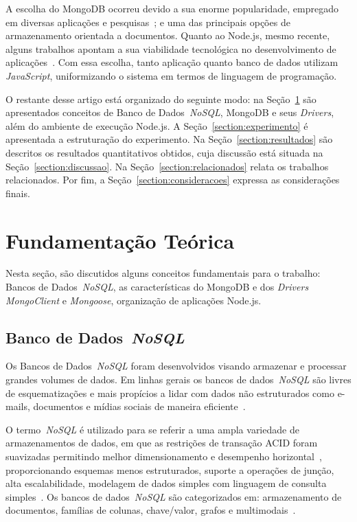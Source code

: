 \documentclass[12pt]{article}
\begin{document}
A escolha do MongoDB ocorreu devido a sua enorme popularidade, empregado em diversas aplicações e pesquisas~\cite{patil:2017,jung:2015,ongo:2018,kanade2014study}; e uma das principais opções de armazenamento orientada a documentos. 
Quanto ao Node.js, mesmo recente, alguns trabalhos apontam a sua viabilidade tecnológica no desenvolvimento de aplicações~\cite{chaniotis2015node}. Com essa escolha, tanto aplicação quanto banco de dados utilizam \textit{JavaScript}, uniformizando o sistema em termos de linguagem de programação.

O restante desse artigo está organizado do seguinte modo: na Seção~\ref{section:fundamentacao} são apresentados conceitos de Banco de Dados~\emph{NoSQL}, MongoDB e seus \emph{Drivers}, além do ambiente de execução Node.js. 
A Seção~\ref{section:experimento} é apresentada a estruturação do experimento. 
Na Seção~\ref{section:resultados} são descritos os resultados quantitativos obtidos, cuja discussão está situada na Seção~\ref{section:discussao}. Na Seção~\ref{section:relacionados} relata os trabalhos relacionados. Por fim, a Seção~\ref{section:consideracoes} expressa as considerações finais.

\section{Fundamentação Teórica}
\label{section:fundamentacao}

Nesta seção, são discutidos alguns conceitos fundamentais para o trabalho: Bancos de Dados~\emph{NoSQL}, as características do MongoDB e dos \emph{Drivers} \emph{MongoClient} e \emph{Mongoose}, organização de aplicações Node.js. 

\subsection{Banco de Dados~\emph{NoSQL}}
\label{subsection:nao-relacional}

Os Bancos de Dados~\emph{NoSQL} foram desenvolvidos visando armazenar e processar grandes volumes de dados. 
Em linhas gerais os bancos de dados~\emph{NoSQL} são livres de esquematizações e mais propícios a lidar com dados não estruturados como e-mails, documentos e mídias sociais de maneira eficiente~\cite{mohamed:2014,ramesh:2016}.

O termo~\emph{NoSQL} é utilizado para se referir a uma ampla variedade de armazenamentos de dados, em que as restrições de transação ACID foram suavizadas permitindo melhor dimensionamento e desempenho horizontal~\cite{rafique:2018}, proporcionando esquemas menos estruturados, suporte a operações de junção, alta escalabilidade, modelagem de dados simples com linguagem de consulta simples~\cite{ramesh:2016}. 
Os bancos de dados~\emph{NoSQL} são categorizados em: armazenamento de documentos, famílias de colunas, chave/valor, grafos e multimodais~\cite{aparicio:2016}.
\end{document}
